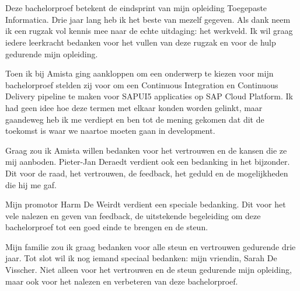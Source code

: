 
\chapter*{}
\label{ch:voorwoord}


Deze bachelorproef betekent de eindsprint van mijn opleiding Toegepaste Informatica. Drie jaar lang heb ik het beste van mezelf gegeven. Als dank neem ik een rugzak vol kennis mee naar de echte uitdaging: het werkveld.
Ik wil graag iedere leerkracht bedanken voor het vullen van deze rugzak en voor de hulp gedurende mijn opleiding.

Toen ik bij Amista ging aankloppen om een onderwerp te kiezen voor mijn bachelorproef stelden zij voor om een Continuous Integration en Continuous Delivery pipeline te maken voor SAPUI5 applicaties op SAP Cloud Platform. Ik had geen idee hoe deze termen met elkaar konden worden gelinkt, maar gaandeweg heb ik me verdiept en ben tot de mening gekomen dat dit de toekomst is waar we naartoe moeten gaan in development.

Graag zou ik Amista willen bedanken voor het vertrouwen en de kansen die ze mij aanboden.
Pieter-Jan Deraedt verdient ook een bedanking in het bijzonder. Dit voor de raad, het vertrouwen, de feedback, het geduld en de mogelijkheden die hij me gaf.

Mijn promotor Harm De Weirdt verdient een speciale bedanking. Dit voor het vele nalezen en geven van feedback, de uitstekende begeleiding om deze bachelorproef tot een goed einde te brengen en de steun.

Mijn familie zou ik graag bedanken voor alle steun en vertrouwen gedurende drie jaar.
Tot slot wil ik nog iemand speciaal bedanken: mijn vriendin, Sarah De Visscher. Niet alleen voor het vertrouwen en de steun gedurende mijn opleiding, maar ook voor het nalezen en verbeteren van deze bachelorproef.

